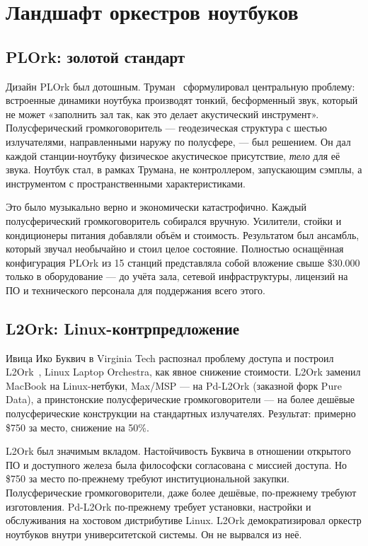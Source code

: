 \documentclass[10pt,letterpaper,twocolumn]{article}
\begin{document}

\section{Ландшафт оркестров ноутбуков}
\label{sec:landscape}

\subsection{PLOrk: золотой стандарт}

Дизайн PLOrk был дотошным. Труман~\citep{trueman2007why} сформулировал центральную проблему: встроенные динамики ноутбука производят тонкий, бесформенный звук, который не может «заполнить зал так, как это делает акустический инструмент». Полусферический громкоговоритель --- геодезическая структура с шестью излучателями, направленными наружу по полусфере, --- был решением. Он дал каждой станции-ноутбуку физическое акустическое присутствие, \emph{тело} для её звука. Ноутбук стал, в рамках Трумана, не контроллером, запускающим сэмплы, а инструментом с пространственными характеристиками.

Это было музыкально верно и экономически катастрофично. Каждый полусферический громкоговоритель собирался вручную. Усилители, стойки и кондиционеры питания добавляли объём и стоимость. Результатом был ансамбль, который звучал необычайно и стоил целое состояние. Полностью оснащённая конфигурация PLOrk из 15 станций представляла собой вложение свыше \$30.000 только в оборудование --- до учёта зала, сетевой инфраструктуры, лицензий на ПО и технического персонала для поддержания всего этого.

\subsection{L2Ork: Linux-контрпредложение}

Ивица Ико Буквич в Virginia Tech распознал проблему доступа и построил L2Ork~\citep{bukvic2010l2ork}, Linux Laptop Orchestra, как явное снижение стоимости. L2Ork заменил MacBook на Linux-нетбуки, Max/MSP --- на Pd-L2Ork (заказной форк Pure Data), а принстонские полусферические громкоговорители --- на более дешёвые полусферические конструкции на стандартных излучателях. Результат: примерно \$750 за место, снижение на 50\%.

L2Ork был значимым вкладом. Настойчивость Буквича в отношении открытого ПО и доступного железа была философски согласована с миссией доступа. Но \$750 за место по-прежнему требуют институциональной закупки. Полусферические громкоговорители, даже более дешёвые, по-прежнему требуют изготовления. Pd-L2Ork по-прежнему требует установки, настройки и обслуживания на хостовом дистрибутиве Linux. L2Ork демократизировал оркестр ноутбуков внутри университетской системы. Он не вырвался из неё.
\end{document}
